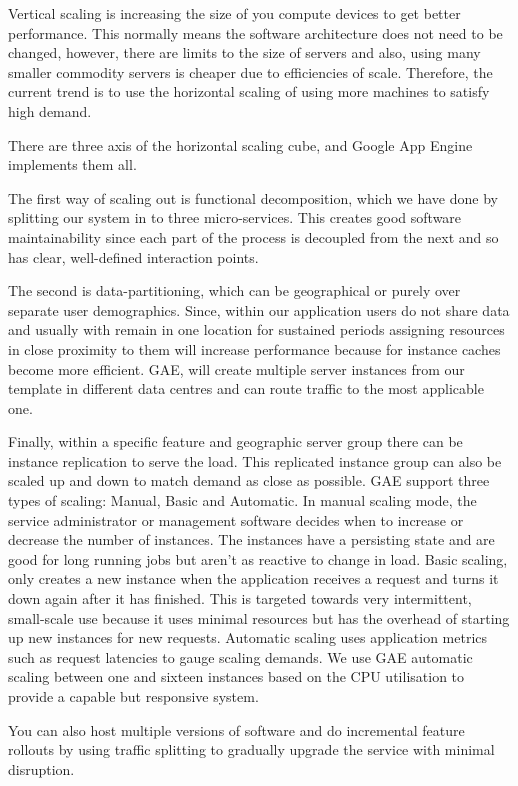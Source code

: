 \documentclass[conference]{IEEEtran}
\begin{document}
Vertical scaling is increasing the size of you compute devices to get better performance. This normally means the software architecture does not need to be changed, however, there are limits to the size of servers and also, using many smaller commodity servers is cheaper due to efficiencies of scale. Therefore, the current trend is to use the horizontal scaling of using more machines to satisfy high demand.

There are three axis of the horizontal scaling cube, and Google App Engine
implements them all.

The first way of scaling out is functional decomposition, which we have done by splitting our system in to three micro-services. This creates good software maintainability since each part of the process is decoupled from the next and so has clear, well-defined interaction points.

The second is data-partitioning, which can be geographical or purely over separate user demographics. Since, within our application users do not share data and usually with remain in one location for sustained periods assigning resources in close proximity to them will increase performance because for instance caches become more efficient. GAE, will create multiple server instances from our template in different data centres and can route traffic to the most applicable one. 

Finally, within a specific feature and geographic server group there can be
instance replication to serve the load. This replicated instance group can also
be scaled up and down to match demand as close as possible. GAE support three
types of scaling: Manual, Basic and Automatic. In manual scaling mode, the
service administrator or management software decides when to increase or
decrease the number of instances. The instances have a persisting state and are
good for long running jobs but aren't as reactive to change in load. Basic
scaling, only creates a new instance when the application receives a request and
turns it down again after it has finished. This is targeted towards very
intermittent, small-scale use because it uses minimal resources but has the
overhead of starting up new instances for new requests. Automatic scaling uses application metrics such as request latencies to gauge scaling demands. We use GAE automatic scaling between one and sixteen instances based on the CPU utilisation to provide a capable but responsive system.

You can also host multiple versions of software and do incremental feature rollouts by using traffic splitting to gradually upgrade the service with minimal disruption.
\end{document}
